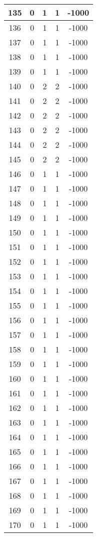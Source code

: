 \documentclass[letterpaper, 12pt]{article}
\begin{document}
\begin{longtable}{|c|c|c|c|c|}
\hline
135 & 0 & 1 & 1 & -1000 \\
\hline
136 & 0 & 1 & 1 & -1000 \\
\hline
137 & 0 & 1 & 1 & -1000 \\
\hline
138 & 0 & 1 & 1 & -1000 \\
\hline
139 & 0 & 1 & 1 & -1000 \\
\hline
140 & 0 & 2 & 2 & -1000 \\
\hline
141 & 0 & 2 & 2 & -1000 \\
\hline
142 & 0 & 2 & 2 & -1000 \\
\hline
143 & 0 & 2 & 2 & -1000 \\
\hline
144 & 0 & 2 & 2 & -1000 \\
\hline
145 & 0 & 2 & 2 & -1000 \\
\hline
146 & 0 & 1 & 1 & -1000 \\
\hline
147 & 0 & 1 & 1 & -1000 \\
\hline
148 & 0 & 1 & 1 & -1000 \\
\hline
149 & 0 & 1 & 1 & -1000 \\
\hline
150 & 0 & 1 & 1 & -1000 \\
\hline
151 & 0 & 1 & 1 & -1000 \\
\hline
152 & 0 & 1 & 1 & -1000 \\
\hline
153 & 0 & 1 & 1 & -1000 \\
\hline
154 & 0 & 1 & 1 & -1000 \\
\hline
155 & 0 & 1 & 1 & -1000 \\
\hline
156 & 0 & 1 & 1 & -1000 \\
\hline
157 & 0 & 1 & 1 & -1000 \\
\hline
158 & 0 & 1 & 1 & -1000 \\
\hline
159 & 0 & 1 & 1 & -1000 \\
\hline
160 & 0 & 1 & 1 & -1000 \\
\hline
161 & 0 & 1 & 1 & -1000 \\
\hline
162 & 0 & 1 & 1 & -1000 \\
\hline
163 & 0 & 1 & 1 & -1000 \\
\hline
164 & 0 & 1 & 1 & -1000 \\
\hline
165 & 0 & 1 & 1 & -1000 \\
\hline
166 & 0 & 1 & 1 & -1000 \\
\hline
167 & 0 & 1 & 1 & -1000 \\
\hline
168 & 0 & 1 & 1 & -1000 \\
\hline
169 & 0 & 1 & 1 & -1000 \\
\hline
170 & 0 & 1 & 1 & -1000 \\

\end{longtable}
\end{document}
